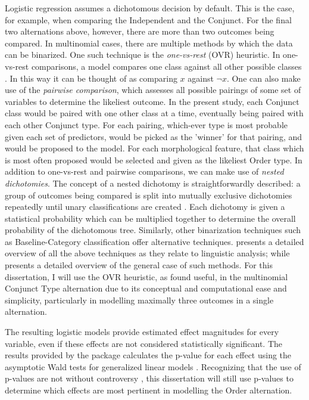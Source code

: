 Logistic regression assumes a dichotomous decision by default. This is the case, for example, when comparing the Independent and the Conjunct. For the final two alternations above, however, there are more than two outcomes being compared. In multinomial cases, there are multiple methods by which the data can be binarized. One such technique is the \textit{one-vs-rest} (OVR) heuristic. In one-vs-rest comparisons, a model compares one class against all other possible classes \citep{Kramer2004}. In this way it can be thought of as comparing $x$ against $\neg x$. One can also make use of the \textit{pairwise comparison}, which assesses all possible pairings of some set of variables to determine the likeliest outcome. In the present study, each Conjunct class would be paired with one other class at a time, eventually being paired with each other Conjunct type. For each pairing, which-ever type is most probable given each set of predictors, would be picked as the 'winner' for that pairing, and would be proposed to the model. For each morphological feature, that class which is most often proposed would be selected and given as the likeliest Order type. In addition to one-vs-rest and pairwise comparisons, we can make use of \textit{nested dichotomies}. The concept of a nested dichotomy is straightforwardly described: a group of outcomes being compared is split into mutually exclusive dichotomies repeatedly until unary classifications are created \citep{Kramer2004}. Each dichotomy is given a statistical probability which can be multiplied together to determine the overall probability of the dichotomous tree. Similarly, other binarization techniques such as Baseline-Category \citep[468]{fox1997applied} classification offer alternative techniques. \citet{arppe2008univariate} presents a detailed overview of all the above techniques as they relate to linguistic analysis; while \citet{Kramer2004} presents a detailed overview of the general case of such methods. For this dissertation, I will use the OVR heuristic, as \citet{arppe2008univariate} found useful, in the multinomial Conjunct Type alternation due to its conceptual and computational ease and simplicity, particularly in modelling maximally three outcomes in a single alternation.


The resulting logistic models provide estimated effect magnitudes for every variable, even if these effects are not considered statistically significant. The results provided by the  package calculates the p-value for each effect using the asymptotic Wald tests for generalized linear models \citep{lme4}. Recognizing that the use of p-values are not without controversy \citep{gelman2016problems}, this dissertation will still use p-values to determine which effects are most pertinent in modelling the Order alternation.

